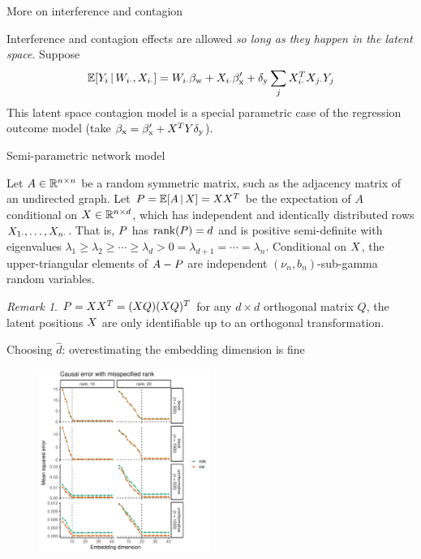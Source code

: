\documentclass[aspectratio=169]{beamer}
\theoremstyle{remark}
\newtheorem*{remark}{Remark}
\begin{document}
\begin{frame}{More on interference and contagion}

    Interference and contagion effects are allowed \emph{so long as they happen in the latent space}. Suppose
    \begin{align*}
        \E[\W_{i \cdot}, \X_{i \cdot}]{Y_i}
        = \W_{i \cdot} \betaw + \X_{i \cdot} \beta'_\text{x} + \delta_\text{y} \sum_{j} \X_{i \cdot}^T \X_{j \cdot} Y_j
    \end{align*}
    This latent space contagion model is a special parametric case of the regression outcome model (take $\beta_\text{x} = \beta'_\text{x} + X^T Y \delta_\text{y}$).

\end{frame}

\begin{frame}{Semi-parametric network model}

    \begin{definition}
        Let $A \in \mathbb{R}^{n \times n}$ be a random symmetric matrix, such as the adjacency matrix of an undirected graph. Let $\Apop = \E[\X]{A} = \X \X^T$ be the expectation of $A$ conditional on $X \in \mathbb{R}^{n \times d}$, which has independent and identically distributed rows $X_{1 \cdot}, \dots, X_{n \cdot}$. That is, $P$ has $\rank \paren*{\Apop} = d$ and is positive semi-definite with eigenvalues $\lambda_1 \ge \lambda_2 \ge \cdots \ge \lambda_d > 0 = \lambda_{d+1} = \cdots = \lambda_n$. Conditional on $X$, the upper-triangular elements of $A - P$ are independent $(\nu_n, b_n)$-sub-gamma random variables.
    \end{definition}

    \begin{remark}
        $P = X X^T = (X Q) (X Q)^T$ for any $d \times d$ orthogonal matrix $Q$, the latent positions $X$ are only identifiable up to an orthogonal transformation.
    \end{remark}

\end{frame}

\begin{frame}{Choosing $\widehat{d}$: overestimating the embedding dimension is fine}

    \centering

    \begin{figure}
        \includegraphics[width=0.5\textwidth]{figures/misspecification/loss_average.pdf}
    \end{figure}

\end{frame}
\end{document}
